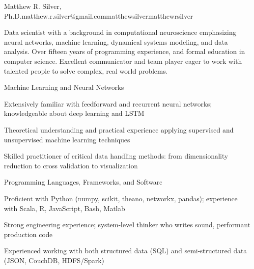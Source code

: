 \documentclass{report}
\begin{document}

  \begin{resume_header}{Matthew R. Silver, Ph.D.}{matthew.r.silver@gmail.com}{}{matthewsilver}{matthewrsilver}

    Data scientist with a background in computational neuroscience emphasizing neural networks, machine learning, dynamical systems modeling, and data analysis. Over fifteen years of programming experience, and formal education in computer science. Excellent communicator and team player eager to work with talented people to solve complex, real world problems.

  \end{resume_header}





  \begin{skillset}{Machine Learning and Neural Networks}
    \item Extensively familiar with feedforward and recurrent neural networks; knowledgeable about deep learning and LSTM
    \item Theoretical understanding and practical experience applying supervised and unsupervised machine learning techniques
    \item Skilled practitioner of critical data handling methods: from dimensionality reduction to cross validation to visualization
  \end{skillset}

  \begin{skillset}{Programming Languages, Frameworks, and Software}
    \item Proficient with Python (numpy, scikit, theano, networkx, pandas); experience with Scala, R, JavaScript, Bash, Matlab
    \item Strong \CC{} engineering experience; system-level thinker who writes sound, performant production code
    \item Experienced working with both structured data (SQL) and semi-structured data (JSON, CouchDB, HDFS/Spark)
  \end{skillset}




\end{document}
